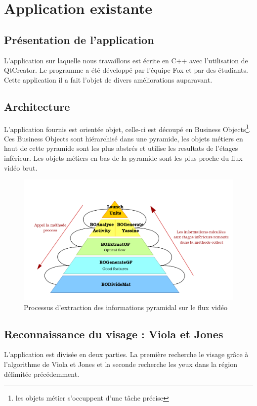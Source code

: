 \section{Application existante}

\subsection{Présentation de l'application}
L'application sur laquelle nous travaillons est écrite en C++ avec l'utilisation de QtCreator. Le 
programme a été développé par l'équipe Fox et par des étudiants. Cette application il a fait 
l'objet de divers améliorations auparavant.\\

\subsection{Architecture}
L'application fournis est orientée objet, celle-ci est découpé en Business Objects\footnote{les objets 
métier s'occuppent d'une tâche précise}. Ces Business Objects sont hiérarchisé dans une pyramide, les 
objets métiers en haut de cette pyramide sont les plus abstrés et utilise les resultats de l'étages infèrieur. 
Les objets métiers en bas de la pyramide sont les plus proche du flux vidéo brut.


\begin{figure}[H]
  \centering
  \includegraphics[width=12cm]{image/pyramide.png}
  \caption{Processus d'extraction des informations pyramidal sur le flux vidéo}
\end{figure}


\subsection{Reconnaissance du visage : Viola et Jones}
L'application est divisée en deux parties. La première recherche le visage grâce à
l'algorithme de Viola et Jones et la seconde recherche les yeux dans la région délimitée
précédemment.\\

